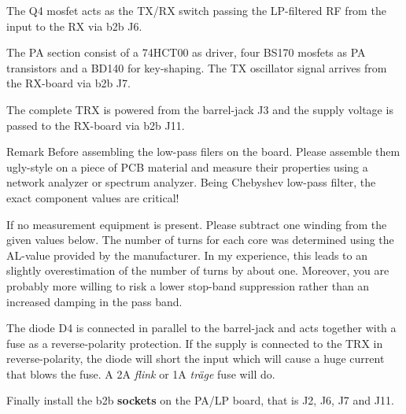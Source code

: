 \documentclass[10pt, a4paper,twoside,openright]{scrartcl}
\newenvironment{remark}{\begin{bclogo}[couleur=blue!30,arrondi=.1,logo=\bcinfo,ombre=true]{Remark}}{\end{bclogo}}
\begin{document}
The Q4 mosfet acts as the TX/RX switch passing the LP-filtered RF from the input to the RX via b2b J6.

The PA section consist of a 74HCT00 as driver, four BS170 mosfets as PA transistors and a BD140 for key-shaping. The TX oscillator signal arrives from the RX-board via b2b J7.

The complete TRX is powered from the barrel-jack J3 and the supply voltage is passed to the RX-board via b2b J11. 

\begin{remark}
 Before assembling the low-pass filers on the board. Please assemble them ugly-style on a piece of PCB material and measure their properties using a network analyzer or spectrum analyzer. Being Chebyshev low-pass filter, the exact component values are critical!
\end{remark}

 If no measurement equipment is present. Please subtract one winding from the given values below. The number of turns for each core was determined using the AL-value provided by the manufacturer. In my experience, this leads to an slightly overestimation of the number of turns by about one. Moreover, you are probably more willing to risk a lower stop-band suppression rather than an increased damping in the pass band.
 
 The diode D4 is connected in parallel to the barrel-jack and acts together with a fuse as a reverse-polarity protection. If the supply is connected to the TRX in reverse-polarity, the diode will short the input which will cause a huge current that blows the fuse. A 2A \emph{flink} or 1A \emph{träge} fuse will do.
 
 Finally install the b2b \textbf{sockets} on the PA/LP board, that is J2, J6, J7 and J11.
 
\clearpage
\end{document}

